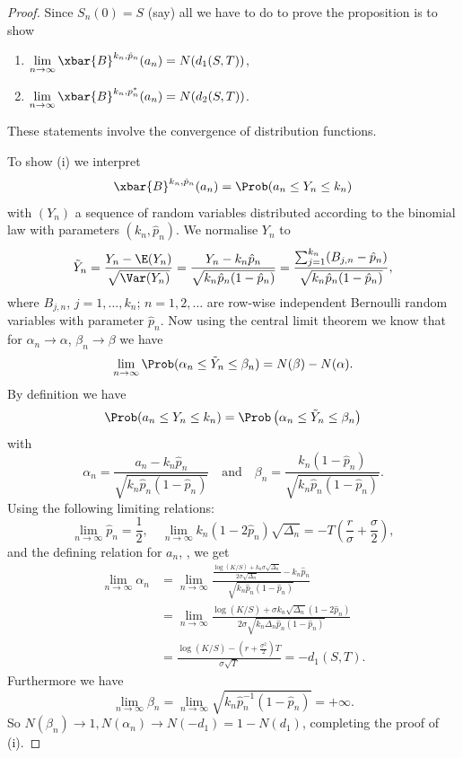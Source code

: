 \begin{proof}
	Since \(S_n(0) = S\) (say) all we have to do to prove the proposition is to show
	\begin{enumerate}[label=(\roman*)]
		\item \(\displaystyle \lim_{n\to\infty} \xbar{B}^{k_n, \hat{p}_n}(a_n) = N(d_1(S,T))\),
		\item \(\displaystyle \lim_{n\to\infty} \xbar{B}^{k_n, p_n^*}(a_n) = N(d_2(S,T))\).
	\end{enumerate}
	These statements involve the convergence of distribution functions.

	To show (i) we interpret
	\[
		\xbar{B}^{k_n, \hat{p}_n}(a_n) = \Prob(a_n \le Y_n \le k_n)
	\]
	with \((Y_n)\) a sequence of random variables distributed according to the binomial law with parameters \((k_n, \hat{p}_n)\). We normalise \(Y_n\) to
	\[
		\tilde{Y}_n = \frac{Y_n - \E(Y_n)}{\sqrt{\Var(Y_n)}} = \frac{Y_n - k_n\hat{p}_n}{\sqrt{k_n\hat{p}_n(1-\hat{p}_n)}} = \frac{\sum_{j=1}^{k_n} (B_{j,n} - \hat{p}_n)}{\sqrt{k_n\hat{p}_n(1-\hat{p}_n)}},
	\]
	where \(B_{j,n}\), \(j=1,\dots,k_n\); \(n=1,2,\dots\) are row-wise independent Bernoulli random variables with parameter \(\hat{p}_n\). Now using the central limit theorem we know that for \(\alpha_n \to \alpha\), \(\beta_n \to \beta\) we have
	\[
		\lim_{n\to\infty} \Prob(\alpha_n \le \tilde{Y}_n \le \beta_n) = N(\beta) - N(\alpha).
	\]
	By definition we have
	\[
		\Prob(a_n \le Y_n \le k_n) = \Prob \left(\alpha_n \le \tilde{Y}_n \le \beta_n\right)
	\]
	with
	\[
		\alpha_n = \frac{a_n - k_n\hat{p}_n}{\sqrt{k_n\hat{p}_n(1-\hat{p}_n)}} \quad \text{and} \quad \beta_n = \frac{k_n(1-\hat{p}_n)}{\sqrt{k_n\hat{p}_n(1-\hat{p}_n)}}.
	\]
	Using the following limiting relations:
	\[
		\lim_{n\to\infty} \hat{p}_n = \frac{1}{2}, \quad \lim_{n\to\infty} k_n(1 - 2\hat{p}_n)\sqrt{\Delta_n} = -T \left(\frac{r}{\sigma} + \frac{\sigma}{2}\right),
	\]
	and the defining relation for \(a_n\), , we get
	\begin{align*}
		\lim_{n\to\infty} \alpha_n & = \lim_{n\to\infty} \frac{\frac{\log(K/S) + k_n\sigma\sqrt{\Delta_n}}{2\sigma\sqrt{\Delta_n}} - k_n\hat{p}_n}{\sqrt{k_n\hat{p}_n(1-\hat{p}_n)}} \\
		                           & = \lim_{n\to\infty} \frac{\log(K/S) + \sigma k_n \sqrt{\Delta_n}(1 - 2\hat{p}_n)}{2\sigma \sqrt{k_n\Delta_n\hat{p}_n(1-\hat{p}_n)}}             \\
		                           & = \frac{\log(K/S) - (r + \frac{\sigma^2}{2})T}{\sigma\sqrt{T}} = -d_1(S,T).
	\end{align*}
	Furthermore we have
	\[
		\lim_{n\to\infty} \beta_n = \lim_{n\to\infty} \sqrt{k_n\hat{p}_n^{-1}(1 - \hat{p}_n)} = +\infty.
	\]
	So \(N(\beta_n) \to 1, N(\alpha_n) \to N(-d_1) = 1 - N(d_1)\), completing the proof of (i).


\end{proof}

